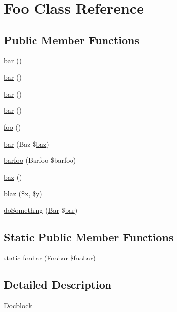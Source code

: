 \hypertarget{class_foo}{}\section{Foo Class Reference}
\label{class_foo}
\subsection*{Public Member Functions}
\begin{DoxyCompactItemize}
\item 
\mbox{\hyperlink{class_foo_ad2e199af8a32cd5a9a5ba591aac8431c}{bar}} ()
\item 
\mbox{\hyperlink{class_foo_ad2e199af8a32cd5a9a5ba591aac8431c}{bar}} ()
\item 
\mbox{\hyperlink{class_foo_ad2e199af8a32cd5a9a5ba591aac8431c}{bar}} ()
\item 
\mbox{\hyperlink{class_foo_ad2e199af8a32cd5a9a5ba591aac8431c}{bar}} ()
\item 
\mbox{\hyperlink{class_foo_a79418a120498dd9cf915655654607747}{foo}} ()
\item 
\mbox{\hyperlink{class_foo_a3dc02da2254d8b5658d8469b83b40c30}{bar}} (Baz \$\mbox{\hyperlink{class_foo_ae7a58e6eb64e3fa0d88ff421f558d8f4}{baz}})
\item 
\mbox{\hyperlink{class_foo_a837e6944a4b67c4b7df63b92ac771a5f}{barfoo}} (Barfoo \$barfoo)
\item 
\mbox{\hyperlink{class_foo_ae7a58e6eb64e3fa0d88ff421f558d8f4}{baz}} ()
\item 
\mbox{\hyperlink{class_foo_a384675d796353ee2fb35b679f4d478ce}{blaz}} (\$x, \$y)
\item 
\mbox{\hyperlink{class_foo_af63f96af5b933414cb5150278f069fb8}{do\+Something}} (\mbox{\hyperlink{class_bar}{Bar}} \$\mbox{\hyperlink{class_foo_ad2e199af8a32cd5a9a5ba591aac8431c}{bar}})
\end{DoxyCompactItemize}
\subsection*{Static Public Member Functions}
\begin{DoxyCompactItemize}
\item 
static \mbox{\hyperlink{class_foo_a89b46eec1742fecfdccad39d2a740179}{foobar}} (Foobar \$foobar)
\end{DoxyCompactItemize}


\subsection{Detailed Description}
Docblock

